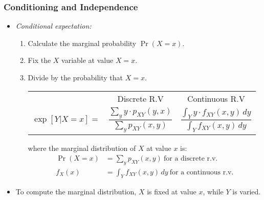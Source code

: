 \begin{frame}
\frametitle{Conditioning and Independence} 
\begin{itemize}
\item  \emph{Conditional expectation:} 
\begin{enumerate}
\item Calculate the marginal probability $\Pr(X=x)$.
\item Fix the $X$ variable at value $X=x$.
\item Divide by the probability that $X=x$.
\pause
\begin{center}
\begin{tabular}{ccc}
\toprule
& Discrete R.V & Continuous R.V \\
$\exp[Y|X=x] = $ 
    & $ \dfrac{\sum_y y\cdot p_{XY}(y,x)}{\sum_y p_{XY}(x,y)}$ 
    & $ \dfrac{\int_Y y\cdot f_{XY}(x,y)\,dy}{\int_Y f_{XY}(x,y)\,dy}$\\
\bottomrule
\end{tabular}
\end{center}
where the marginal distribution of $X$ at value $x$ is:
\begin{align*}
\Pr(X=x) 
    & = \sum_y p_{XY}(x,y) ~\text{for a discrete r.v.}\\
f_X(x) 
    & = \int_Y f_{XY}(x,y)\,dy ~\text{for a continuous r.v.}
\end{align*}
\end{enumerate}
\item To compute the marginal distribution, $X$ is fixed at value $x$, while $Y$ is varied.
\end{itemize}
\end{frame}


